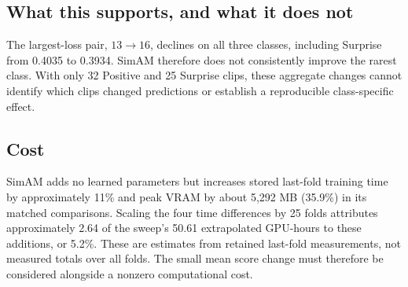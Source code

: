 \subsection{What this supports, and what it does not}
\label{sec:simam-supports}

The largest-loss pair, $13\rightarrow16$, declines on all three classes, including Surprise from 0.4035 to 0.3934. SimAM therefore does not consistently improve the rarest class. With only 32 Positive and 25 Surprise clips, these aggregate changes cannot identify which clips changed predictions or establish a reproducible class-specific effect.

\subsection{Cost}
\label{sec:simam-cost}

SimAM adds no learned parameters but increases stored last-fold training time by approximately 11\% and peak VRAM by about 5,292 MB (35.9\%) in its matched comparisons. Scaling the four time differences by 25 folds attributes approximately 2.64 of the sweep's 50.61 extrapolated GPU-hours to these additions, or 5.2\%. These are estimates from retained last-fold measurements, not measured totals over all folds. The small mean score change must therefore be considered alongside a nonzero computational cost.
